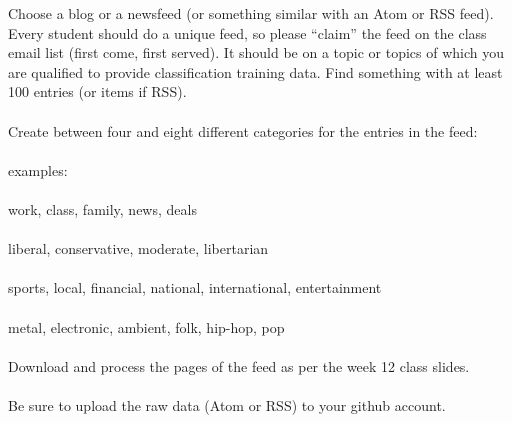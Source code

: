 Choose a blog or a newsfeed (or something similar with an Atom
or RSS feed).  Every student should do a unique feed, so please \enquote{claim} the feed on the class email list (first come, first served).
It should be on a topic or topics of which you are qualified to
provide classification training data.  Find something with at least
100 entries (or items if RSS).\\
\\
Create between four and eight different categories for the entries
in the feed:\\
\\
examples: \\
\\
work, class, family, news, deals\\
\\
liberal, conservative, moderate, libertarian\\
\\
sports, local, financial, national, international, entertainment\\
\\
metal, electronic, ambient, folk, hip-hop, pop\\
\\
Download and process the pages of the feed as per the week 12 
class slides.\\
\\
Be sure to upload the raw data (Atom or RSS) to your github account.